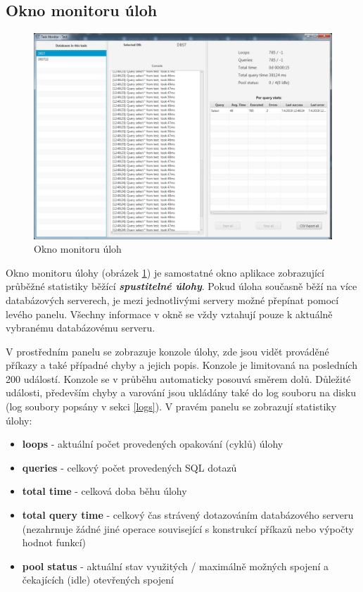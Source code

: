 \documentclass[czech,bachelor,public,dept460,male,cpdeclaration,twoside]{diploma}
\begin{document}
\subsection{Okno monitoru úloh} \label{taskmonwin}
\begin{figure}[!htbp]\centering\includegraphics[width=1.0\textwidth]{Figures/taskmongui.png}\caption{Okno monitoru úloh}
\label{taskmonitor}
\end{figure}
Okno monitoru úlohy (obrázek \ref{taskmonitor}) je samostatné okno aplikace zobrazující  průběžné statistiky běžící \textbf{\emph{spustitelné úlohy}}. Pokud úloha současně běží na více databázových serverech, je mezi jednotlivými servery možné přepínat pomocí levého panelu. Všechny informace v okně se vždy vztahují pouze k aktuálně vybranému databázovému serveru. 

V prostředním panelu se zobrazuje konzole úlohy, zde jsou vidět prováděné příkazy a také případné chyby a jejich popis. Konzole je limitovaná na posledních 200 událostí. Konzole se v průběhu automaticky posouvá směrem dolů. Důležité události, především chyby a varování jsou ukládány také do log souboru na disku (log soubory popsány v sekci \ref{logs}). V pravém panelu se zobrazují statistiky úlohy:
\begin{itemize}
\item \textbf{loops} - aktuální počet provedených opakování (cyklů) úlohy
\item \textbf{queries} - celkový počet provedených SQL dotazů
\item \textbf{total time} - celková doba běhu úlohy 
\item \textbf{total query time} - celkový čas strávený dotazováním databázového serveru (nezahrnuje žádné jiné operace související s konstrukcí příkazů nebo výpočty hodnot funkcí)
\item \textbf{pool status} - aktuální stav využitých / maximálně možných spojení a čekajících (idle) otevřených spojení
\end{itemize}
\end{document}
